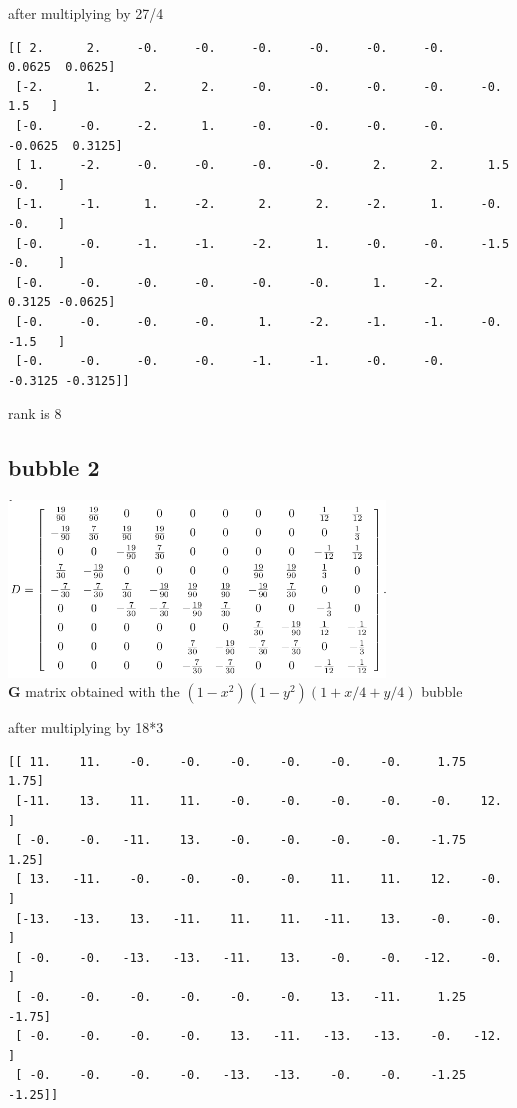 after multiplying by 27/4
\begin{verbatim}
[[ 2.      2.     -0.     -0.     -0.     -0.     -0.     -0.      0.0625  0.0625]
 [-2.      1.      2.      2.     -0.     -0.     -0.     -0.     -0.      1.5   ]
 [-0.     -0.     -2.      1.     -0.     -0.     -0.     -0.     -0.0625  0.3125]
 [ 1.     -2.     -0.     -0.     -0.     -0.      2.      2.      1.5    -0.    ]
 [-1.     -1.      1.     -2.      2.      2.     -2.      1.     -0.     -0.    ]
 [-0.     -0.     -1.     -1.     -2.      1.     -0.     -0.     -1.5    -0.    ]
 [-0.     -0.     -0.     -0.     -0.     -0.      1.     -2.      0.3125 -0.0625]
 [-0.     -0.     -0.     -0.      1.     -2.     -1.     -1.     -0.     -1.5   ]
 [-0.     -0.     -0.     -0.     -1.     -1.     -0.     -0.     -0.3125 -0.3125]]
\end{verbatim}

rank is 8



\subsection*{bubble 2}

\begin{center}
\includegraphics[width=10cm]{python_codes/fieldstone_72/images/mat3}\\
{\captionfont ${\bm G}$ matrix obtained with the $(1-x^2)(1-y^2)(1+x/4+y/4)$ bubble}
\end{center}

after multiplying by 18*3
\begin{verbatim}
[[ 11.    11.    -0.    -0.    -0.    -0.    -0.    -0.     1.75   1.75]
 [-11.    13.    11.    11.    -0.    -0.    -0.    -0.    -0.    12.  ]
 [ -0.    -0.   -11.    13.    -0.    -0.    -0.    -0.    -1.75   1.25]
 [ 13.   -11.    -0.    -0.    -0.    -0.    11.    11.    12.    -0.  ]
 [-13.   -13.    13.   -11.    11.    11.   -11.    13.    -0.    -0.  ]
 [ -0.    -0.   -13.   -13.   -11.    13.    -0.    -0.   -12.    -0.  ]
 [ -0.    -0.    -0.    -0.    -0.    -0.    13.   -11.     1.25  -1.75]
 [ -0.    -0.    -0.    -0.    13.   -11.   -13.   -13.    -0.   -12.  ]
 [ -0.    -0.    -0.    -0.   -13.   -13.    -0.    -0.    -1.25  -1.25]]
\end{verbatim}

